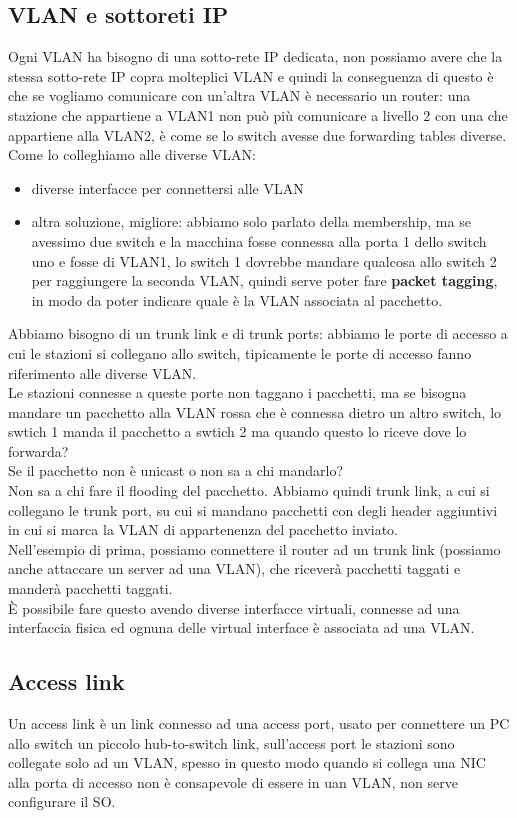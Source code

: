 \documentclass[12pt, oneside]{extbook} %
\begin{document}
\subsection{VLAN e sottoreti IP}
Ogni VLAN ha bisogno di una sotto-rete IP dedicata, non possiamo avere che la stessa sotto-rete IP copra molteplici VLAN e quindi la conseguenza di questo è che se vogliamo comunicare con un'altra VLAN è necessario un router: una stazione che appartiene a VLAN1 non può più comunicare a livello 2 con una che appartiene alla VLAN2, è come se lo switch avesse due forwarding tables diverse.
\\ Come lo colleghiamo alle diverse VLAN:
\begin{itemize}
\item diverse interfacce per connettersi alle VLAN
\item altra soluzione, migliore: abbiamo solo parlato della membership, ma se avessimo due switch e la macchina fosse connessa alla porta 1 dello switch uno e fosse di VLAN1, lo switch 1 dovrebbe mandare qualcosa allo switch 2 per raggiungere la seconda VLAN, quindi serve poter fare \textbf{packet tagging}, in modo da poter indicare quale è la VLAN associata al pacchetto.
\end{itemize}
Abbiamo bisogno di un trunk link e di trunk ports: abbiamo le porte di accesso a cui le stazioni si collegano allo switch, tipicamente le porte di accesso fanno riferimento alle diverse VLAN.
\\Le stazioni connesse a queste porte non taggano i pacchetti, ma se bisogna mandare un pacchetto alla VLAN rossa che è connessa dietro un altro switch, lo swtich 1 manda il pacchetto a swtich 2 ma quando questo lo riceve dove lo forwarda?
\\Se il pacchetto non è unicast o non sa a chi mandarlo?
\\Non sa a chi fare il flooding del pacchetto.
Abbiamo quindi trunk link, a cui si collegano le trunk port, su cui si mandano pacchetti con degli header aggiuntivi in cui si marca la VLAN di appartenenza del pacchetto inviato.
\\Nell'esempio di prima, possiamo connettere il router ad un trunk link (possiamo anche attaccare un server ad una VLAN), che riceverà pacchetti taggati e manderà pacchetti taggati.
\\È possibile fare questo avendo diverse interfacce virtuali, connesse ad una interfaccia fisica ed ognuna delle virtual interface è associata ad una VLAN.

\subsection{Access link}
Un access link è un link connesso ad una access port, usato per connettere un PC allo switch un piccolo hub-to-switch link, sull'access port le stazioni sono collegate solo ad un VLAN, spesso in questo modo quando si collega una NIC alla porta di accesso non è consapevole di essere in uan VLAN, non serve configurare il SO.
\end{document}
